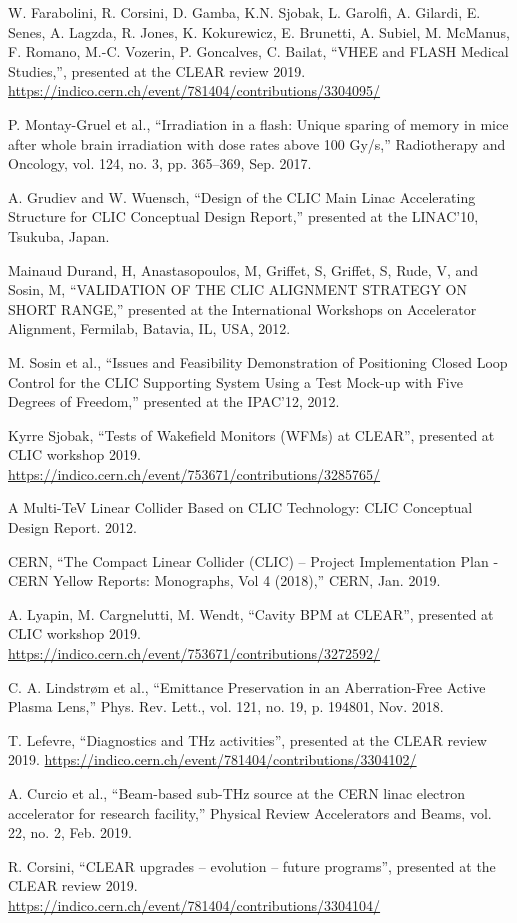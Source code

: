 \documentclass[a4paper,
               keeplastbox,   %
               ]{jacow}
\begin{document}
\begin{thebibliography}{99}
 W. Farabolini, R. Corsini, D. Gamba, K.N. Sjobak, L. Garolfi, A. Gilardi, E. Senes, A. Lagzda, R. Jones, K. Kokurewicz, E. Brunetti, A. Subiel, M. McManus, F. Romano, M.-C. Vozerin, P. Goncalves, C. Bailat, ``VHEE and FLASH Medical Studies,'', presented at the CLEAR review 2019. \url{https://indico.cern.ch/event/781404/contributions/3304095/}

 P. Montay-Gruel et al., “Irradiation in a flash: Unique sparing of memory in mice after whole brain irradiation with dose rates above 100 Gy/s,” Radiotherapy and Oncology, vol. 124, no. 3, pp. 365–369, Sep. 2017.

 A. Grudiev and W. Wuensch, “Design of the CLIC Main Linac Accelerating Structure for CLIC Conceptual Design Report,” presented at the LINAC’10, Tsukuba, Japan.

 Mainaud Durand, H, Anastasopoulos, M, Griffet, S, Griffet, S, Rude, V, and Sosin, M, “VALIDATION OF THE CLIC ALIGNMENT STRATEGY ON SHORT RANGE,” presented at the International Workshops on Accelerator Alignment, Fermilab, Batavia, IL, USA, 2012.

 M. Sosin et al., “Issues and Feasibility Demonstration of Positioning Closed Loop Control for the CLIC Supporting System Using a Test Mock-up with Five Degrees of Freedom,” presented at the IPAC’12, 2012.

 Kyrre Sjobak, ``Tests of Wakefield Monitors (WFMs) at CLEAR'', presented at CLIC workshop 2019. \url{https://indico.cern.ch/event/753671/contributions/3285765/}

 A Multi-TeV Linear Collider Based on CLIC Technology: CLIC Conceptual Design Report. 2012.

 CERN, “The Compact Linear Collider (CLIC) – Project Implementation Plan - CERN Yellow Reports: Monographs, Vol 4 (2018),” CERN, Jan. 2019.

 A. Lyapin, M. Cargnelutti, M. Wendt, ``Cavity BPM at CLEAR'', presented at CLIC workshop 2019. \url{https://indico.cern.ch/event/753671/contributions/3272592/}

 C. A. Lindstrøm et al., “Emittance Preservation in an Aberration-Free Active Plasma Lens,” Phys. Rev. Lett., vol. 121, no. 19, p. 194801, Nov. 2018.

 T. Lefevre, ``Diagnostics and THz activities'', presented at the CLEAR review 2019. \url{https://indico.cern.ch/event/781404/contributions/3304102/}

 A. Curcio et al., “Beam-based sub-THz source at the CERN linac electron accelerator for research facility,” Physical Review Accelerators and Beams, vol. 22, no. 2, Feb. 2019.

 R. Corsini, ``CLEAR upgrades -- evolution -- future programs'', presented at the CLEAR review 2019. \url{https://indico.cern.ch/event/781404/contributions/3304104/}

\end{thebibliography}
\end{document}
